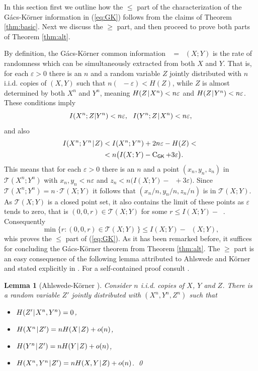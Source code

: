 \documentclass{IEEEtran}
\newtheorem{lemma}[theorem]{Lemma}
\newcommand\eps{\varepsilon}
\newcommand\T{\mathcal{T}}
\DeclareMathOperator\GK{C_{\mathsf{GK}}}
\newcommand\I{I\xspace}
\renewcommand\H{H\xspace}
\def\|{\mkern 1.4mu\mathord{|}\mkern 1.4mu}
\renewcommand{\ge}{\geqslant}
\renewcommand{\le}{\leqslant}
\begin{document}
In this section first we outline how the $\le$ part of the characterization
of the G\'acs-K\"orner information in (\ref{eq:GK}) follows from the claims
of Theorem \ref{thm:basic}. Next we discuss the $\ge$ part, and then proceed
to prove both parts of Theorem \ref{thm:alt}.

By definition, the G\'acs-K\"orner common information $\GK=\GK(X;Y)$ is the
rate of randomness which can be simultaneously extracted from both $X$ and
$Y$. That is, for each $\eps>0$ there is an $n$ and a random variable
$Z$ jointly distributed with $n$ {i.i.d.} copies of $(X,Y)$ such that
$n(\GK-\eps) < H(Z)$, while $Z$ is almost determined by both $X^n$ and
$Y^n$, meaning $\H(Z\|X^n)<n\eps$ and $\H(Z\|Y^n)<n\eps$. These conditions
imply
$$
   \I(X^n;Z|Y^n)<n\eps, ~~ \I(Y^n;Z\|X^n)<n\eps,
$$
and also
\begin{align*}
   \I(X^n;Y^n\|Z) &< \I(X^n;Y^n)+2n\eps -H(Z) <{}\\
                  &< n\big( \I(X;Y)-\GK +3\eps \big).
\end{align*}
This means that for each $\eps>0$ there is an $n$ and a point
$(x_n,y_n,z_n)$ in $\T(X^n;Y^n)$ with $x_n,y_n<n\eps$ and $z_n<
n\big(\I(X;Y)-\GK+3\eps\big)$. Since $\T(X^n;Y^n)=n\cdot\T(X;Y)$ it follows
that $(x_n/n,y_n/n,z_n/n)$ is in $\T(X;Y)$. As $\T(X;Y)$ is a closed point
set, it also contains the limit of these points as $\eps$ tends to zero,
that is $(0,0,r)\in\T(X;Y)$ for some $r\le \I(X;Y)-\GK$. Consequently
$$
   \min\{r: (0,0,r)\in\T(X;Y)\,\} \le \I(X;Y)-\GK(X;Y),
$$
whis proves the $\le$ part of (\ref{eq:GK}). As it has been remarked before,
it suffices for concluding the G\'acs-K\"orner theorem from Theorem
\ref{thm:alt}. The $\ge$ part is an easy consequence of the following lemma
attributed to Ahlswede and K\"orner and stated explicitly in \cite{tarik}.
For a self-contained proof consult \cite{MMRV}.

\begin{lemma}[Ahlswede-K\"orner \cite{AGK,CsK81}]
Consider $n$ {i.i.d.} copies of $X$, $Y$ and $Z$. There is a random variable $Z'$ 
jointly distributed with $(X^n,Y^n,Z^n)$ such that
\begin{itemize}
\item $\H(Z' \| X^n,Y^n)=0$,
\item $\H(X^n\|Z') = n\H(X\|Z)+o(n)$,
\item $\H(Y^n\|Z') = n\H(Y\|Z)+o(n)$,
\item $\H(X^n,Y^n\|Z') = n\H(X,Y\|Z)+o(n)$. \qed
\end{itemize}
\end{lemma}
\end{document}

